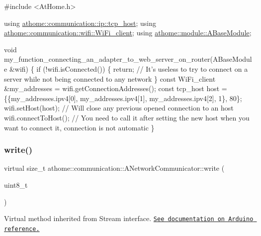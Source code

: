 \begin{DoxyCode}
\textcolor{preprocessor}{#include <AtHome.h>}

\textcolor{keyword}{using} \mbox{\hyperlink{structathome_1_1communication_1_1ip_1_1s__host}{athome::communication::ip::tcp\_host}};
\textcolor{keyword}{using} \mbox{\hyperlink{structathome_1_1communication_1_1wifi_1_1s__wifi__client}{athome::communication::wifi::WiFi\_client}};
\textcolor{keyword}{using} \mbox{\hyperlink{classathome_1_1module_1_1_a_base_module}{athome::module::ABaseModule}};

\textcolor{keywordtype}{void} my\_function\_connecting\_an\_adapter\_to\_web\_server\_on\_router(ABaseModule
&wifi) \{ \textcolor{keywordflow}{if} (!wifi.isConnected()) \{ \textcolor{keywordflow}{return}; \textcolor{comment}{// It's useless to try to}
connect on a server \textcolor{keywordflow}{while} not being connected to any network
  \}
  \textcolor{keyword}{const} WiFi\_client &my\_addresses = wifi.getConnectionAddresses();
  \textcolor{keyword}{const} tcp\_host host = \{\{my\_addresses.ipv4[0], my\_addresses.ipv4[1],
my\_addresses.ipv4[2], 1\}, 80\}; wifi.setHost(host); \textcolor{comment}{// Will close any}
previous opened connection to an host wifi.connectToHost(); \textcolor{comment}{// You need to}
call it after setting the \textcolor{keyword}{new} host when you want to connect it, connection
is not automatic
\}
\end{DoxyCode}
 \mbox{\label{classathome_1_1communication_1_1_a_network_communicator_a87adf68359a4ec5b0a38bea529ebf732}} 
\subsubsection{\texorpdfstring{write()}{write()}}
{\footnotesize\ttfamily virtual size\+\_\+t athome\+::communication\+::\+A\+Network\+Communicator\+::write (\begin{DoxyParamCaption}\item[{uint8\+\_\+t}]{ }\end{DoxyParamCaption})\hspace{0.3cm}{\ttfamily [pure virtual]}}

Virtual method inherited from Stream interface. \href{https://www.arduino.cc/en/Serial/Write}{\tt See documentation on Arduino reference.} 

